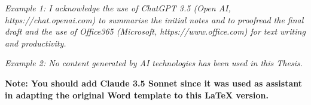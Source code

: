 {{\begin{minipage}[t]{12.43cm}
{{{{\begin{flushleft}
            \vspace{\baselineskip}
            
            \fontsize{9}{11}\selectfont\textit{Example 1: I acknowledge the use of ChatGPT 3.5 (Open AI, https://chat.openai.com) to summarise the initial notes and to proofread the final draft and the use of Office365 (Microsoft, https://www.office.com) for text writing and productivity.}
            
            \vspace{\baselineskip}
            
            \fontsize{9}{11}\selectfont\textit{Example 2: No content generated by AI technologies has been used in this Thesis.}

            \vspace{\baselineskip}

            \textbf{Note: You should add Claude 3.5 Sonnet since it was used as assistant in adapting the original Word template to this LaTeX version.}
            \end{flushleft}
            \vspace{-10000pt}
    }}}}
    \end{minipage}
}
}